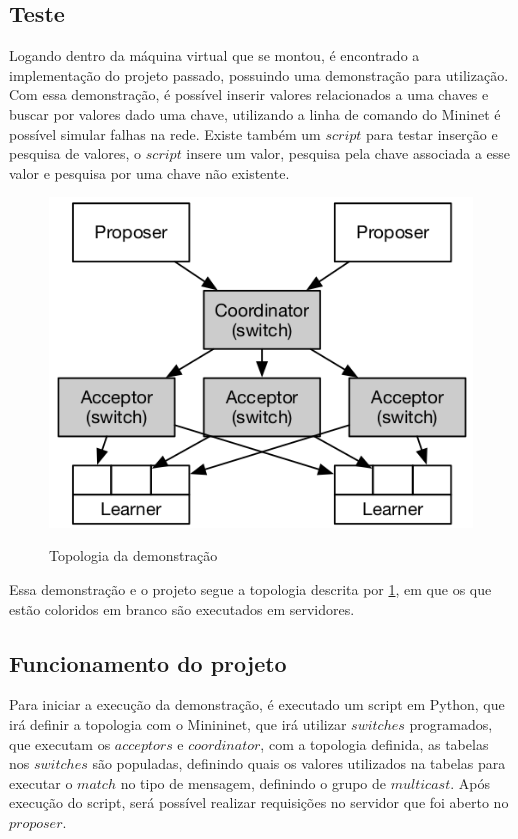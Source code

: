 \documentclass[
    12pt,
    openright, 
    oneside,
    a4paper,
    french,
    english,
    brazil
    ]{facom-ufu-abntex2}
\theoremstyle{definition}
\begin{document}
\subsection{Teste}

Logando dentro da máquina virtual que se montou, é encontrado a implementação do projeto
passado, possuindo uma demonstração para utilização. Com essa demonstração, é possível
inserir valores relacionados a uma chaves e buscar por valores dado uma chave, utilizando
a linha de comando do Mininet é possível simular falhas na rede. Existe também um $script$
para testar inserção e pesquisa de valores, o $script$ insere um valor, pesquisa pela chave
associada a esse valor e pesquisa por uma chave não existente.

\begin{figure}[ht]
    \caption{Topologia da demonstração \cite{dang2016paxos}}
    \centering
    \includegraphics[scale=0.8]{images/arq.png}
    \label{fig:demo-topo}
\end{figure}

Essa demonstração e o projeto segue a topologia descrita por \ref{fig:demo-topo}, em que os
que estão coloridos em branco são executados em servidores.

\subsection{Funcionamento do projeto}
Para iniciar a execução da demonstração, é executado um script em Python, que irá definir a
topologia com o Minininet, que irá utilizar $switches$ programados, que executam os $acceptors$
e $coordinator$, com a topologia definida, as tabelas nos $switches$ são populadas, definindo
quais os valores utilizados na tabelas para executar o $match$ no tipo de mensagem, definindo o
grupo de $multicast$. Após execução do script, será possível realizar requisições no servidor
que foi aberto no $proposer$.
\end{document}
